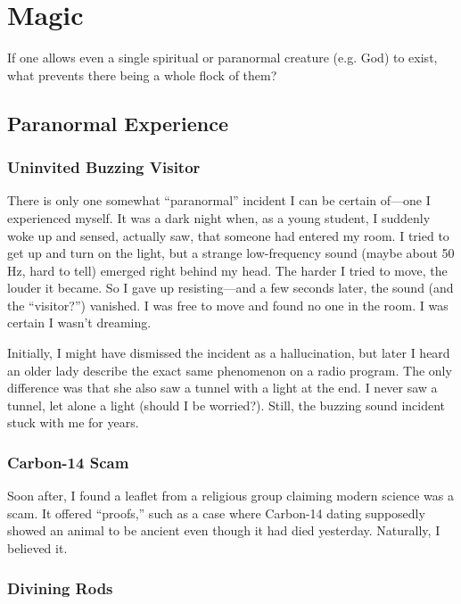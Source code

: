 \chapter{Magic}
\label{chap:magic}

If one allows even a single spiritual or paranormal creature (e.g. God) to exist, what prevents there being a whole flock of them?

\section{Paranormal Experience}

\subsection*{Uninvited Buzzing Visitor}

There is only one somewhat ``paranormal'' incident I can be certain of—one I experienced myself. It was a dark night when, as a young student, I suddenly woke up and sensed, actually saw, that someone had entered my room. I tried to get up and turn on the light, but a strange low-frequency sound (maybe about 50 Hz, hard to tell) emerged right behind my head. The harder I tried to move, the louder it became. So I gave up resisting—and a few seconds later, the sound (and the ``visitor?'') vanished. I was free to move and found no one in the room. I was certain I wasn't dreaming.

Initially, I might have dismissed the incident as a hallucination, but later I heard an older lady describe the exact same phenomenon on a radio program. The only difference was that she also saw a tunnel with a light at the end. I never saw a tunnel, let alone a light (should I be worried?). Still, the buzzing sound incident stuck with me for years.

\subsection*{Carbon-14 Scam}

Soon after, I found a leaflet from a religious group claiming modern science was a scam. It offered ``proofs,'' such as a case where Carbon-14 dating supposedly showed an animal to be ancient even though it had died yesterday. Naturally, I believed it.


\subsection*{Divining Rods}

